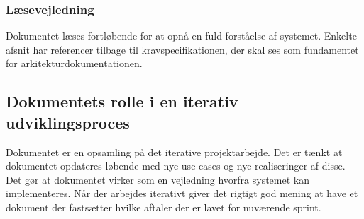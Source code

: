 \subsubsection{Læsevejledning}
Dokumentet læses fortløbende for at opnå en fuld forståelse af systemet. Enkelte afsnit har referencer tilbage til kravspecifikationen, der skal ses som fundamentet for arkitekturdokumentationen.

\subsection{Dokumentets rolle i en iterativ udviklingsproces}
Dokumentet er en opsamling på det iterative projektarbejde. 
Det er tænkt at dokumentet opdateres løbende med nye use cases og nye realiseringer af disse. 
Det gør at dokumentet virker som en vejledning hvorfra systemet kan implementeres. 
Når der arbejdes iterativt giver det rigtigt god mening at have et dokument der fastsætter hvilke aftaler der er lavet for nuværende sprint.